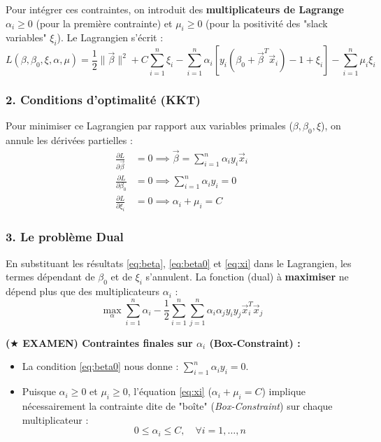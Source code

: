 Pour intégrer ces contraintes, on introduit des \textbf{multiplicateurs de Lagrange} $\alpha_i \geq 0$ (pour la première contrainte) et $\mu_i \geq 0$ (pour la positivité des "slack variables" $\xi_i$). Le Lagrangien s'écrit :
\begin{equation}
L(\beta, \beta_0, \xi, \alpha, \mu) = \frac{1}{2}\|\vec{\beta}\|^2 + C \sum_{i=1}^n \xi_i - \sum_{i=1}^n \alpha_i \left[ y_i(\beta_0 + \vec{\beta}^T \vec{x}_i) - 1 + \xi_i \right] - \sum_{i=1}^n \mu_i \xi_i
\end{equation}

\subsubsection{2. Conditions d'optimalité (KKT)}
Pour minimiser ce Lagrangien par rapport aux variables primales ($\beta, \beta_0, \xi$), on annule les dérivées partielles :
\begin{align}
    \frac{\partial L}{\partial \vec{\beta}} &= 0 \implies \vec{\beta} = \sum_{i=1}^n \alpha_i y_i \vec{x}_i \label{eq:beta} \\
    \frac{\partial L}{\partial \beta_0} &= 0 \implies \sum_{i=1}^n \alpha_i y_i = 0 \label{eq:beta0} \\
    \frac{\partial L}{\partial \xi_i} &= 0 \implies \alpha_i + \mu_i = C \label{eq:xi}
\end{align}

\subsubsection{3. Le problème Dual}
En substituant les résultats \eqref{eq:beta}, \eqref{eq:beta0} et \eqref{eq:xi} dans le Lagrangien, les termes dépendant de $\beta_0$ et de $\xi_i$ s'annulent. La fonction (dual) à \textbf{maximiser} ne dépend plus que des multiplicateurs $\alpha_i$ :
\begin{equation}
\max_{\alpha} \sum_{i=1}^n \alpha_i - \frac{1}{2} \sum_{i=1}^n \sum_{j=1}^n \alpha_i \alpha_j y_i y_j \vec{x}_i^T \vec{x}_j
\end{equation}

\textbf{($\bigstar$ EXAMEN) Contraintes finales sur $\alpha_i$ (Box-Constraint) :}
\begin{itemize}
    \item La condition \eqref{eq:beta0} nous donne : $\sum_{i=1}^n \alpha_i y_i = 0$.
    \item Puisque $\alpha_i \geq 0$ et $\mu_i \geq 0$, l'équation \eqref{eq:xi} ($\alpha_i + \mu_i = C$) implique nécessairement la contrainte dite de "boîte" (\textit{Box-Constraint}) sur chaque multiplicateur :
    \begin{equation}
        0 \leq \alpha_i \leq C, \quad \forall i=1, \dots, n
    \end{equation}
\end{itemize}

